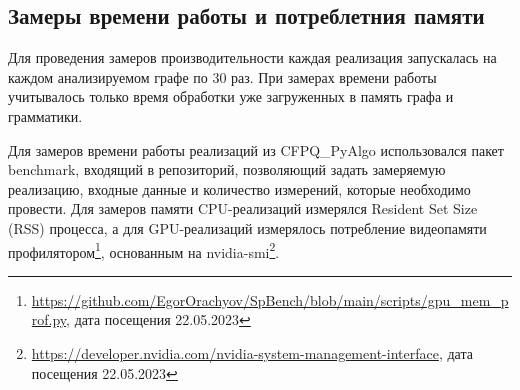 \begin{table}[h!]
    \centering
    \caption{Описание графов из тестового набора для Points-to анализа, учитывающего поля}
\label{tab:graphs_descr_java}
\end{table}

\subsection{Замеры времени работы и потреблетния памяти}

Для проведения замеров производительности каждая реализация запускалась на каждом анализируемом графе по 30 раз. При замерах времени работы учитывалось только время обработки уже загруженных в память графа и грамматики.

Для замеров времени работы реализаций из CFPQ\_PyAlgo использовался пакет benchmark, входящий в репозиторий, позволяющий задать замеряемую реализацию, входные данные и количество измерений, которые необходимо провести. Для замеров памяти CPU-реализаций измерялся Resident Set Size (RSS) процесса, а для GPU-реализаций измерялось потребление видеопамяти профилятором\footnote{\url{https://github.com/EgorOrachyov/SpBench/blob/main/scripts/gpu_mem_prof.py}, дата посещения 22.05.2023}, основанным на nvidia-smi\footnote{\url{https://developer.nvidia.com/nvidia-system-management-interface}, дата посещения 22.05.2023}.

